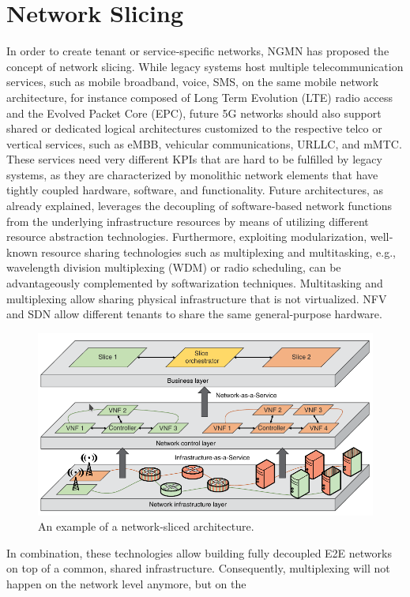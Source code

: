 \documentclass{article}
\begin{document}
\section{Network Slicing} 
In order to create tenant or service‐specific networks, NGMN has proposed the concept of network slicing. While legacy systems host multiple telecommunication
services, such as mobile broadband, voice, SMS, on the same mobile network architecture, for
instance composed of Long Term Evolution (LTE) radio access and the Evolved Packet Core (EPC),
future 5G networks should also support shared or dedicated logical architectures customized to the
respective telco or vertical services, such as \gls{eMBB}, vehicular communications, \gls{URLLC}, and \gls{mMTC}. These services need very different KPIs that are
hard to be fulfilled by legacy systems, as they are characterized by monolithic network elements that
have tightly coupled hardware, software, and functionality. Future architectures, as already explained, leverages the decoupling of software‐based network functions from the underlying infrastructure resources by
means of utilizing different resource abstraction technologies.
Furthermore, exploiting modularization, well‐known resource sharing technologies such as multiplexing and multitasking, e.g.,
wavelength division multiplexing (WDM) or radio scheduling, can be advantageously complemented
by softwarization techniques. Multitasking and multiplexing allow sharing
physical infrastructure that is not virtualized. NFV and SDN allow different tenants to share the
same general‐purpose hardware. 
\begin{figure}[H]
\centering
\includegraphics[scale=0.55]{pics/slice.png}
\caption{An example of a network‐sliced architecture.} 
\label{slice}
\end{figure}
In combination, these technologies allow building fully decoupled E2E networks on top of a common, shared infrastructure. Consequently, multiplexing will not happen on the network level anymore, but on the
\end{document}
